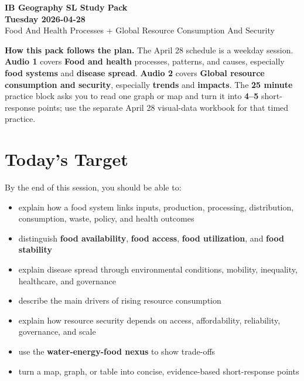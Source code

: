 \documentclass[11pt,a4paper]{article}
\newcommand{\term}[1]{\textcolor{HeadingBlue}{\textbf{#1}}}
\newcommand{\boxnote}[3]{%
\noindent\colorbox{#1}{%
  \begin{minipage}{0.965\textwidth}
  \sffamily
  \textbf{\textcolor{HeadingBlue}{#2}} #3
  \end{minipage}
}}
\begin{document}
\begin{center}
  {\sffamily\bfseries\color{HeadingBlue}\LARGE IB Geography SL Study Pack}\\[0.25em]
  {\sffamily\bfseries\color{AccentTeal}\Large Tuesday 2026-04-28}\\[0.35em]
  {\sffamily\color{TextInk}Food And Health Processes + Global Resource Consumption And Security}
\end{center}

\vspace{0.5em}

\boxnote{SoftBlue}{How this pack follows the plan.}{The April 28 schedule is a
weekday session. \term{Audio 1} covers \term{Food and health} processes,
patterns, and causes, especially \term{food systems} and \term{disease spread}.
\term{Audio 2} covers \term{Global resource consumption and security},
especially \term{trends} and \term{impacts}. The \term{25 minute} practice
block asks you to read one graph or map and turn it into \term{4--5}
short-response points; use the separate April 28 visual-data workbook for that
timed practice.}

\section{Today's Target}

By the end of this session, you should be able to:

\begin{itemize}
  \item explain how a food system links inputs, production, processing,
  distribution, consumption, waste, policy, and health outcomes
  \item distinguish \term{food availability}, \term{food access},
  \term{food utilization}, and \term{food stability}
  \item explain disease spread through environmental conditions, mobility,
  inequality, healthcare, and governance
  \item describe the main drivers of rising resource consumption
  \item explain how resource security depends on access, affordability,
  reliability, governance, and scale
  \item use the \term{water-energy-food nexus} to show trade-offs
  \item turn a map, graph, or table into concise, evidence-based
  short-response points
\end{itemize}
\end{document}
